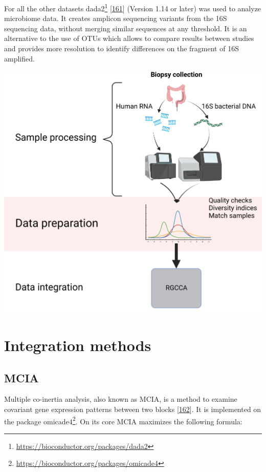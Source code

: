 \documentclass[
  a4paper,
]{book}
\DeclareRobustCommand{\href}[2]{#2\footnote{\url{#1}}}
\let\origfigure\figure
\let\endorigfigure\endfigure
\renewenvironment{figure}[1][2] {
    \expandafter\origfigure\expandafter[!ht]
} {
    \endorigfigure
}
\begin{document}
For all the other datasets \href{https://bioconductor.org/packages/dada2}{dada2} {[}\protect\hyperlink{ref-callahan2016}{161}{]} (Version 1.14 or later) was used to analyze microbiome data.
It creates amplicon sequencing variants from the 16S sequencing data, without merging similar sequences at any threshold.
It is an alternative to the use of OTUs which allows to compare results between studies and provides more resolution to identify differences on the fragment of 16S amplified.

\begin{figure}
\includegraphics[width=1\linewidth]{images/workflow_integration2} \caption[Workflow of the analysis process.]{Workflow of the main analysis process of the thesis. Created with BioRender.com}\label{fig:workflow-process}
\end{figure}

\hypertarget{integration-methods}{%
\section{Integration methods}\label{integration-methods}}

\hypertarget{mcia}{%
\subsection{MCIA}\label{mcia}}

Multiple co-inertia analysis, also known as MCIA, is a method to examine covariant gene expression patterns between two blocks {[}\protect\hyperlink{ref-meng2014}{162}{]}.
It is implemented on the package \href{https://bioconductor.org/packages/omicade4}{omicade4}.
On its core MCIA maximizes the following formula:
\end{document}
